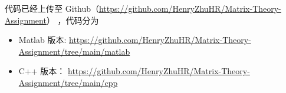 

代码已经上传至
Github（\href{https://github.com/HenryZhuHR/Matrix-Theory-Assignment}{https://github.com/HenryZhuHR/Matrix-Theory-Assignment}）
，代码分为
\begin{itemize}
    \item Matlab 版本: \href{https://github.com/HenryZhuHR/Matrix-Theory-Assignment/tree/main/matlab}{https://github.com/HenryZhuHR/Matrix-Theory-Assignment/tree/main/matlab}
    \item C++ 版本： \href{https://github.com/HenryZhuHR/Matrix-Theory-Assignment/tree/main/cpp}{https://github.com/HenryZhuHR/Matrix-Theory-Assignment/tree/main/cpp}
\end{itemize}

